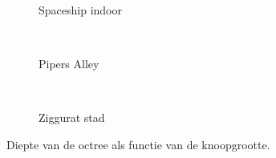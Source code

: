 \begin{figure}[t]
\begin{subfigure}[b]{\textwidth}
  \end{subfigure}\hfill\\
  \begin{minipage}[t]{0.5\textwidth}
  \begin{adjustbox}{minipage=\textwidth, scale=0.55}
    \begin{subfigure}[b]{1.6\textwidth}
      \centering
      \def\svgwidth{\textwidth}
      
      \caption{Spaceship indoor}
      \vspace{4pt}
      \label{fig:hs-n-layers:indoor}
    \end{subfigure}
  \end{adjustbox} \\
  \begin{adjustbox}{minipage=\textwidth, scale=0.55}
    \begin{subfigure}[b]{1.6\textwidth}
      \centering
      \def\svgwidth{\textwidth}
      
      \caption{Pipers Alley}
      \vspace{4pt}
      \label{fig:hs-n-layers:alley}
    \end{subfigure}
  \end{adjustbox} \\
  \begin{adjustbox}{minipage=\textwidth, scale=0.55}
    \begin{subfigure}[b]{1.6\textwidth}
      \centering
      \def\svgwidth{\textwidth}
      
      \caption{Ziggurat stad}
      \label{fig:hs-n-layers:city}
    \end{subfigure}
  \end{adjustbox}
  \caption{\small Diepte van de octree als functie van de knoopgrootte.}
  \label{fig:hs-n-layers}
  \end{minipage} %
  \begin{minipage}[t]{0.5\textwidth}
  \begin{adjustbox}{minipage=\textwidth, scale=0.55}

\end{adjustbox}
\end{minipage}
\end{figure}
